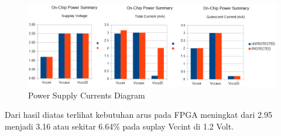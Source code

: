 \begin{figure}
	\centering
	\includegraphics[width=1.0\textwidth]
	{pics/powerConsumption.png}
	\caption{Power Supply Currents Diagram}
	\label{Power Consumption}
\end{figure}


Dari hasil diatas terlihat kebutuhan arus pada FPGA meningkat dari 2.95 menjadi 3.16 atau sekitar 6.64\% pada suplay Vccint di 1.2 Volt.


